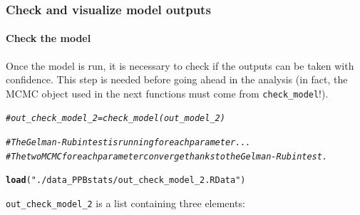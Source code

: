 \documentclass{book}\usepackage[]{graphicx}\usepackage[]{color}
\makeatletter
\newcommand{\hlstr}[1]{\textcolor[rgb]{0.192,0.494,0.8}{#1}}%
\newcommand{\hlcom}[1]{\textcolor[rgb]{0.678,0.584,0.686}{\textit{#1}}}%
\newcommand{\hlstd}[1]{\textcolor[rgb]{0.345,0.345,0.345}{#1}}%
\newcommand{\hlkwd}[1]{\textcolor[rgb]{0.737,0.353,0.396}{\textbf{#1}}}%
\newenvironment{kframe}{%
 \def\at@end@of@kframe{}%
 \ifinner\ifhmode%
  \def\at@end@of@kframe{\end{minipage}}%
  \begin{minipage}{\columnwidth}%
 \fi\fi%
 \def\FrameCommand##1{\hskip\@totalleftmargin \hskip-\fboxsep
 \colorbox{shadecolor}{##1}\hskip-\fboxsep
     \hskip-\linewidth \hskip-\@totalleftmargin \hskip\columnwidth}%
 \MakeFramed {\advance\hsize-\width
   \@totalleftmargin\z@ \linewidth\hsize
   \@setminipage}}%
 {\par\unskip\endMakeFramed%
 \at@end@of@kframe}
\newenvironment{knitrout}{}{} %
\makeatother
\begin{document}
\subsubsection{Check and visualize model outputs}

\paragraph{Check the model}

Once the model is run, it is necessary to check if the outputs can be taken with confidence. 
This step is needed before going ahead in the analysis (in fact, the MCMC object used in the next functions must come from \texttt{check\_model}!).


\begin{knitrout}
\color{fgcolor}\begin{kframe}
\begin{alltt}
\hlcom{# out_check_model_2 = check_model(out_model_2)}

\hlcom{# The Gelman-Rubin test is running for each parameter ...}
\hlcom{# The two MCMC for each parameter converge thanks to the Gelman-Rubin test.}

\hlkwd{load}\hlstd{(}\hlstr{"./data_PPBstats/out_check_model_2.RData"}\hlstd{)}
\end{alltt}


{\ttfamily\noindent\color{warningcolor}{\#\# Warning in readChar(con, 5L, useBytes = TRUE): impossible d'ouvrir le fichier compressé './data\_PPBstats/out\_check\_model\_2.RData', cause probable : 'Aucun fichier ou dossier de ce type'}}

{\ttfamily\noindent\bfseries\color{errorcolor}{\#\# Error in readChar(con, 5L, useBytes = TRUE): impossible d'ouvrir la connexion}}\end{kframe}
\end{knitrout}

\texttt{out\_check\_model\_2} is a list containing three elements:
\end{document}
